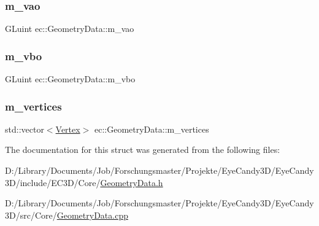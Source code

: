 \mbox{\label{structec_1_1_geometry_data_a2d352d0d0b888258b610afa8ceb7b449}} 
\subsubsection{\texorpdfstring{m\+\_\+vao}{m\_vao}}
{\footnotesize\ttfamily G\+Luint ec\+::\+Geometry\+Data\+::m\+\_\+vao}

\mbox{\label{structec_1_1_geometry_data_aaf6e747c999eee7225183960bb30fc07}} 
\subsubsection{\texorpdfstring{m\+\_\+vbo}{m\_vbo}}
{\footnotesize\ttfamily G\+Luint ec\+::\+Geometry\+Data\+::m\+\_\+vbo}

\mbox{\label{structec_1_1_geometry_data_ade3f4dd48315b696846bb2c00267394c}} 
\subsubsection{\texorpdfstring{m\+\_\+vertices}{m\_vertices}}
{\footnotesize\ttfamily std\+::vector$<$\mbox{\hyperlink{structec_1_1_vertex}{Vertex}}$>$ ec\+::\+Geometry\+Data\+::m\+\_\+vertices}



The documentation for this struct was generated from the following files\+:\begin{DoxyCompactItemize}
\item 
D\+:/\+Library/\+Documents/\+Job/\+Forschungsmaster/\+Projekte/\+Eye\+Candy3\+D/\+Eye\+Candy3\+D/include/\+E\+C3\+D/\+Core/\mbox{\hyperlink{_geometry_data_8h}{Geometry\+Data.\+h}}\item 
D\+:/\+Library/\+Documents/\+Job/\+Forschungsmaster/\+Projekte/\+Eye\+Candy3\+D/\+Eye\+Candy3\+D/src/\+Core/\mbox{\hyperlink{_geometry_data_8cpp}{Geometry\+Data.\+cpp}}\end{DoxyCompactItemize}
